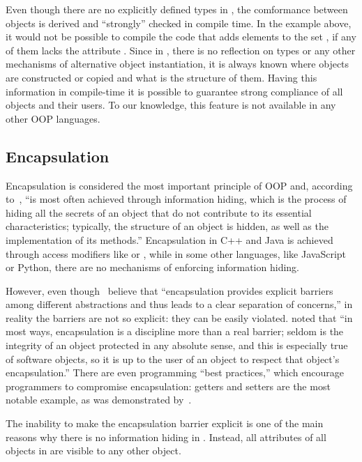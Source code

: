 Even though there are no explicitly defined types in \phic{},
the comformance between objects is derived and ``strongly'' checked
in compile time. In the example above, it would not be possible to
compile the code that adds elements to the set , if any
of them lacks the attribute . Since in \eolang{},
there is no reflection on types or any other mechanisms
of alternative object instantiation, it is always known where
objects are constructed or copied and what is the structure of them.
Having this information in compile-time it is possible to guarantee
strong compliance of all objects and their users. To our knowledge,
this feature is not available in any other OOP languages.

\subsection{Encapsulation}

Encapsulation is considered the most important principle of OOP
and, according to~\citet[p.51]{grady2007object},
``is most often achieved through information hiding,
which is the process of hiding all the secrets of an object
that do not contribute to its essential characteristics;
typically, the structure of an object is hidden, as well
as the implementation of its methods.'' Encapsulation in C++ and
Java is achieved through access modifiers like  or
, while in some other languages, like JavaScript or Python,
there are no mechanisms of enforcing information hiding.

However, even though~\citet[p.51]{grady2007object} believe that
``encapsulation provides explicit barriers among different
abstractions and thus leads to a clear separation of concerns,''
in reality the barriers are not so explicit: they can be easily
violated.
\citet[p.141]{west2004object} noted that
``in most ways, encapsulation is a discipline more than a real barrier;
seldom is the integrity of an object protected in any absolute
sense, and this is especially true of software objects,
so it is up to the user of an object to respect that object's encapsulation.''
There are even programming ``best practices,'' which encourage
programmers to compromise encapsulation: getters and setters are
the most notable example, as was demonstrated by~\citet{holub2004more}.

The inability to make the encapsulation barrier explicit
is one of the main reasons why there is no information hiding in \phic{}.
Instead, all attributes of all objects in \phic{}
are visible to any other object.

